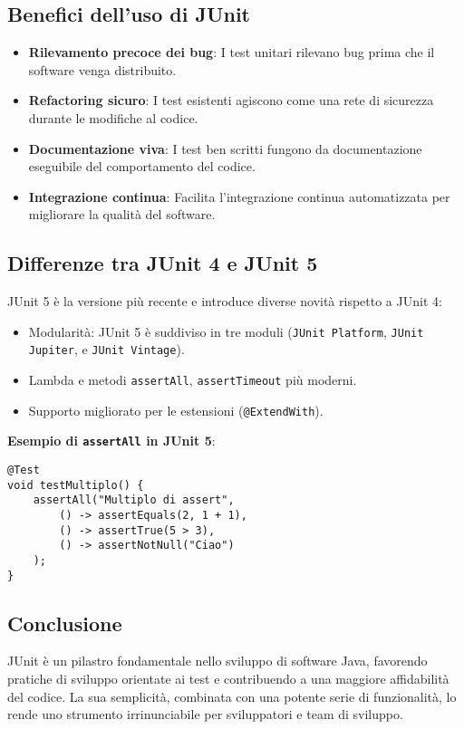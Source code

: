 \documentclass{article}
\begin{document}
\subsection{Benefici dell'uso di JUnit}
\begin{itemize}
    \item \textbf{Rilevamento precoce dei bug}: I test unitari rilevano bug prima che il software venga distribuito.
    \item \textbf{Refactoring sicuro}: I test esistenti agiscono come una rete di sicurezza durante le modifiche al codice.
    \item \textbf{Documentazione viva}: I test ben scritti fungono da documentazione eseguibile del comportamento del codice.
    \item \textbf{Integrazione continua}: Facilita l'integrazione continua automatizzata per migliorare la qualità del software.
\end{itemize}

\subsection{Differenze tra JUnit 4 e JUnit 5}
JUnit 5 è la versione più recente e introduce diverse novità rispetto a JUnit 4:
\begin{itemize}
    \item Modularità: JUnit 5 è suddiviso in tre moduli (\texttt{JUnit Platform}, \texttt{JUnit Jupiter}, e \texttt{JUnit Vintage}).
    \item Lambda e metodi \texttt{assertAll}, \texttt{assertTimeout} più moderni.
    \item Supporto migliorato per le estensioni (\texttt{@ExtendWith}).
\end{itemize}

\textbf{Esempio di \texttt{assertAll} in JUnit 5}:
\begin{lstlisting}
@Test
void testMultiplo() {
    assertAll("Multiplo di assert",
        () -> assertEquals(2, 1 + 1),
        () -> assertTrue(5 > 3),
        () -> assertNotNull("Ciao")
    );
}
\end{lstlisting}

\subsection{Conclusione}
JUnit è un pilastro fondamentale nello sviluppo di software Java, favorendo pratiche di sviluppo orientate ai test e contribuendo a una maggiore affidabilità del codice. La sua semplicità, combinata con una potente serie di funzionalità, lo rende uno strumento irrinunciabile per sviluppatori e team di sviluppo.
\end{document}
